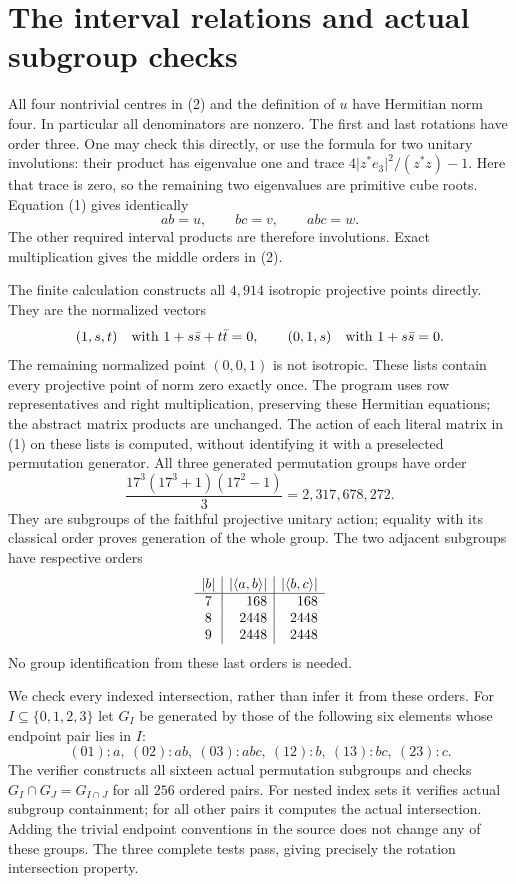 \documentclass[11pt]{article}
\begin{document}
\section*{The interval relations and actual subgroup checks}
All four nontrivial centres in (2) and the definition of $u$ have
Hermitian norm four. In particular all denominators are nonzero.
The first and last rotations have order three. One may check this
directly, or use the formula for two unitary involutions: their product
has eigenvalue one and trace $4\lvert z^*e_3\rvert^2/(z^*z)-1$.
Here that trace is zero, so the remaining two eigenvalues are primitive
cube roots. Equation (1) gives identically
\[
                       ab=u,\qquad bc=v,\qquad abc=w. \tag{4}
\]
The other required interval products are therefore involutions.
Exact multiplication gives the middle orders in (2).

The finite calculation constructs all $4,914$ isotropic projective
points directly. They are the normalized vectors
\[
 (1,s,t)\quad\hbox{with }1+s\bar s+t\bar t=0,
 \qquad (0,1,s)\quad\hbox{with }1+s\bar s=0.
\]
The remaining normalized point $(0,0,1)$ is not isotropic. These
lists contain every projective point of norm zero exactly once.
The program uses row representatives and right multiplication, preserving
these Hermitian equations; the abstract matrix products are unchanged.
The action of each literal matrix in (1) on these lists is computed,
without identifying it with a preselected permutation generator.
All three generated permutation groups have order
\[
 \frac{17^3(17^3+1)(17^2-1)}{3}=2,317,678,272.
\]
They are subgroups of the faithful projective unitary action; equality
with its classical order proves generation of the whole group.
The two adjacent subgroups have respective orders
\[
\begin{array}{c|r|r}
 |b|&|\langle a,b\rangle|&|\langle b,c\rangle|\\\hline
 7&168&168\\
 8&2448&2448\\
 9&2448&2448
\end{array}
\]
No group identification from these last orders is needed.

We check every indexed intersection, rather than infer it from these
orders. For $I\subseteq\{0,1,2,3\}$ let $G_I$ be generated by those
of the following six elements whose endpoint pair lies in $I$:
\[
 (01):a,\ (02):ab,\ (03):abc,\ (12):b,\ (13):bc,\ (23):c.
\]
The verifier constructs all sixteen actual permutation subgroups and
checks $G_I\cap G_J=G_{I\cap J}$ for all $256$ ordered pairs.
For nested index sets it verifies actual subgroup containment; for
all other pairs it computes the actual intersection. Adding the
trivial endpoint conventions in the source does not change any of
these groups. The three complete tests pass, giving precisely the
rotation intersection property.
\end{document}
